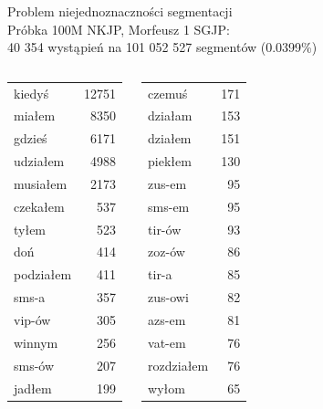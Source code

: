 \documentclass{beamer}
\begin{document}
\begin{frame}{Problem niejednoznaczności segmentacji}
  \\
  Próbka 100M NKJP, Morfeusz 1 SGJP:\\
  40 354 wystąpień na 101 052 527 segmentów (0.0399\%)
  \begin{columns}[c]
    \begin{center}
      \footnotesize
      \begin{tabular}{l|r}
        kiedyś & 12751 \\
        miałem & 8350 \\
        gdzieś & 6171 \\
        udziałem & 4988 \\
        musiałem & 2173 \\
        czekałem & 537 \\
        tyłem & 523 \\
        doń & 414 \\
        podziałem & 411 \\
        sms-a & 357 \\
        vip-ów & 305 \\
        winnym & 256 \\
        sms-ów & 207 \\
        jadłem & 199 \\
      \end{tabular}
    \end{center}
    \begin{center}
      \footnotesize
      \begin{tabular}{l|r}
        czemuś & 171 \\
        działam & 153 \\
        działem & 151 \\
        piekłem & 130 \\
        zus-em & 95 \\
        sms-em & 95 \\
        tir-ów & 93 \\
        zoz-ów & 86 \\
        tir-a & 85 \\
        zus-owi & 82 \\
        azs-em & 81 \\
        vat-em & 76 \\
        rozdziałem & 76 \\
        wyłom & 65 \\

\end{tabular}
\end{center}
\end{columns}
\end{frame}
\end{document}
